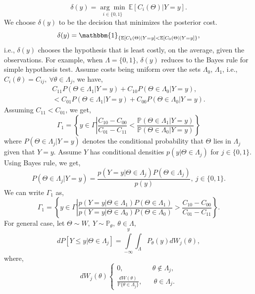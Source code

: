 \documentclass[a4paper,english,12pt]{article}
\begin{document}
\begin{equation}
\delta(y) = \underset{i \in \{0,1\}}{\arg\min}~\mathbb{E}[C_i (\Theta) | Y=y].
\end{equation}
We choose $\delta (y)$ to be the decision that minimizes the posterior cost.
\begin{equation}
\delta(y) =\mathbbm{1}_{\{\mathbb{E}[C_1(\Theta) | Y=y] < \mathbb{E}[C_0(\Theta) | Y=y]\}},
\end{equation} 
i.e., $\delta (y)$ chooses the hypothesis that is least costly, on the average, given the observations. For example, when $\Lambda =\{0,1\}$, $\delta (y)$ reduces to the Bayes rule for simple hypothesis test. Assume costs being uniform over the sets $\Lambda_0$, $\Lambda_1$, i.e., $C_i (\theta) = C_{ij},~\forall\theta \in \Lambda_j$, we have,
\begin{multline}
C_{11} {P}(\Theta \in \Lambda_1  | Y=y)  + C_{10}  {P}(\Theta \in \Lambda_0  | Y=y),\\\nonumber
< C_{01} {P}(\Theta \in \Lambda_1  | Y=y)+C_{00}  {P}(\Theta \in \Lambda_0  | Y=y).
\end{multline}
Assuming $ C_{11} < C_{01}$, we get,
\begin{equation}
\Gamma_1 =\left\{y\in \Gamma \left| \frac{C_{10}-C_{00}}{C_{01}-C_{11}} < \frac{\mathbb{P}(\Theta \in \Lambda_1  | Y=y)}{\mathbb{P}(\Theta \in \Lambda_0  | Y=y)} \right.\right\}
\end{equation}
where ${P}(\Theta \in \Lambda_j  | Y=y)$ denotes the conditional probability that $\Theta$ lies in $\Lambda_j$ given that $Y=y$. Assume $Y$ has conditional densities $p(y | \Theta \in \Lambda_j)$ for $j\in\{0,1\}$. Using Bayes rule, we get, 
\begin{equation}
P( \Theta \in \Lambda_j | Y=y) = \frac{{p(Y=y | \Theta \in \Lambda_j)}{P(\Theta \in \Lambda_j)}}{p(y)},~j\in\{0,1\}.
\end{equation}
We can write $\Gamma_1$ as, 
\begin{equation}
\Gamma_1 =\left\{y\in \Gamma \left|  \frac{{p(Y=y | \Theta \in \Lambda_1)}{P(\Theta \in \Lambda_1)}}{{p(Y=y | \Theta \in \Lambda_0)}{P(\Theta \in \Lambda_0)}} > \frac{C_{10}-C_{00}}{C_{01}-C_{11}}\right. \right\}.
\end{equation}
For general case, let $\Theta \sim W,~Y\sim \mathbb{P}_\theta,~\theta \in \Lambda $,
\begin{equation}
d{P}[Y\leq y | \Theta \in \Lambda_j] = \int\limits_{-\infty}^{y}\int_\Lambda {{P}_\theta(y) dW_j(\theta)},
\end{equation}
where,
\begin{equation}
dW_j(\theta)\begin{cases}
0,\hspace{50pt}\theta \notin \Lambda_j,\\
\frac{dW(\theta)}{\mathbb{P}\{\theta \in \Lambda_j\}},\hspace{20pt}\theta \in \Lambda_j.
\end{cases}
\end{equation}
\end{document}
